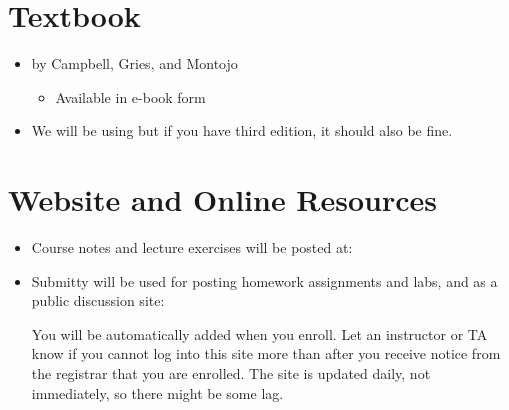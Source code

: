 \documentclass[letterpaper,10pt,english]{sphinxmanual}
\begin{document}
\section{Textbook}
\label{\detokenize{lecture_notes/lec01_intro:textbook}}\begin{itemize}
\item {} 
 by Campbell, Gries, and Montojo
\begin{itemize}
\item {} 
Available in e-book form

\end{itemize}

\item {} 
We will be using  but if you have third edition, it should also be fine.

\end{itemize}


\section{Website and Online Resources}
\label{\detokenize{lecture_notes/lec01_intro:website-and-online-resources}}\begin{itemize}
\item {} 
Course notes and lecture exercises will be posted at:
\begin{quote}

\end{quote}

\item {} 
Submitty will be used for posting homework assignments and labs, and as a
public discussion site:
\begin{quote}

\end{quote}

You will be automatically added when you enroll. Let an instructor or TA know if you cannot log into this site more than  after you receive notice from the registrar that you are enrolled. The site is updated daily, not immediately, so there might be some lag.

\end{itemize}
\end{document}
